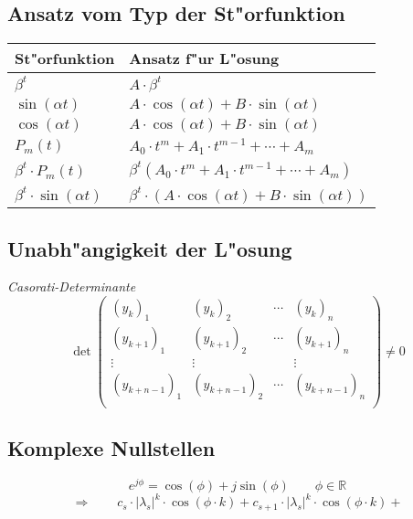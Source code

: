 \subsection{Ansatz vom Typ der St"orfunktion}
\begin{center}\begin{tabular}{l l}
	St"orfunktion & Ansatz f"ur L"osung \\
	\hline
	$\beta^t$						& $A\cdot\beta^t$ \\
	$\sin(\alpha t)$				& $A\cdot\cos(\alpha t)+B\cdot\sin(\alpha t)$ \\
	$\cos(\alpha t)$				& $A\cdot\cos(\alpha t)+B\cdot\sin(\alpha t)$ \\
	$P_m(t)$						& $A_0\cdot t^m+A_1\cdot t^{m-1}+\cdots+A_m$ \\
	$\beta^t\cdot P_m(t)$			& $\beta^t(A_0\cdot t^m+A_1\cdot t^{m-1}+\cdots+A_m)$ \\
	$\beta^t\cdot\sin(\alpha t)$	& $\beta^t\cdot(A\cdot\cos(\alpha t)+B\cdot\sin(\alpha t))$ \\
\end{tabular}\end{center}

\subsection{Unabh"angigkeit der L"osung}
{\em Casorati-Determinante}
\begin{equation}
	\det\begin{pmatrix}
		{(y_{k})}_1		& {(y_{k})}_2		& \cdots	& {(y_{k})}_n \\
		{(y_{k+1})}_1	& {(y_{k+1})}_2		& \cdots	& {(y_{k+1})}_n \\
		\vdots			& \vdots			&			& \vdots \\
		{(y_{k+n-1})}_1	& {(y_{k+n-1})}_2	& \cdots	& {(y_{k+n-1})}_n \\
	\end{pmatrix}\neq 0
\end{equation}

\subsection{Komplexe Nullstellen}
\begin{equation}
	e^{j\phi}=\cos(\phi)+j\sin(\phi)\qquad\phi\in\mathbb{R}
\end{equation}
\begin{equation}
	\Longrightarrow\qquad c_s\cdot|\lambda_s|^k\cdot\cos(\phi\cdot k)+c_{s+1}\cdot|\lambda_s|^k\cdot\cos(\phi\cdot k)+
\end{equation}

